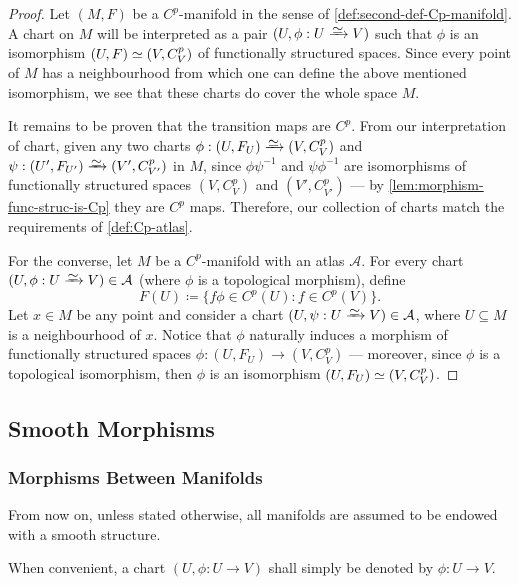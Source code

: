 \begin{proof}
Let \((M, F)\) be a \(C^p\)-manifold in the sense of
\cref{def:second-def-Cp-manifold}. A chart on \(M\) will be interpreted as a
pair \((U, \phi: U \isoto V)\) such that \(\phi\) is an isomorphism
\((U, F) \simeq (V, C_V^p)\) of functionally structured spaces. Since every point
of \(M\) has a neighbourhood from which one can define the above mentioned
isomorphism, we see that these charts do cover the whole space \(M\).

It remains to be proven that the transition maps are \(C^p\). From our
interpretation of chart, given any two charts
\(\phi: (U, F_U) \isoto (V, C_V^p)\) and
\(\psi: (U', F_{U'}) \isoto (V', C_{V'}^p)\) in \(M\), since \(\phi \psi^{-1}\)
and \(\psi \phi^{-1}\) are isomorphisms of functionally structured spaces
\((V, C_V^p)\) and \((V', C_{V'}^p)\) --- by \cref{lem:morphism-func-struc-is-Cp}
they are \(C^p\) maps. Therefore, our collection of charts match the
requirements of \cref{def:Cp-atlas}.

For the converse, let \(M\) be a \(C^p\)-manifold with an atlas
\(\mathcal{A}\). For every chart \((U, \phi: U \isoto V) \in \mathcal{A}\)
(where \(\phi\) is a topological morphism), define
\[
F(U) \coloneq \{f \phi \in C^{p}(U) \colon f \in C^p(V)\}.
\]
Let \(x \in M\) be any point and consider a chart \((U, \psi: U \isoto V)
\in \mathcal{A}\), where \(U \subseteq M\) is a neighbourhood of \(x\). Notice
that \(\phi\) naturally induces a morphism of functionally structured spaces
\(\phi: (U, F_U) \to (V, C_V^p)\) --- moreover, since \(\phi\) is a topological
isomorphism, then \(\phi\) is an isomorphism \((U, F_U) \simeq (V, C_V^p)\).
\end{proof}


\subsection{Smooth Morphisms}

\subsubsection{Morphisms Between Manifolds}

\begin{remark}
\label{rem:manifolds-convention-are-smooth}
From now on, unless stated otherwise, all manifolds are assumed to be endowed
with a smooth structure.
\end{remark}

\begin{remark}
\label{rem:chart-notation}
When convenient, a chart \((U, \phi: U \to V)\) shall simply be denoted by
\(\phi: U \to V\).
\end{remark}

